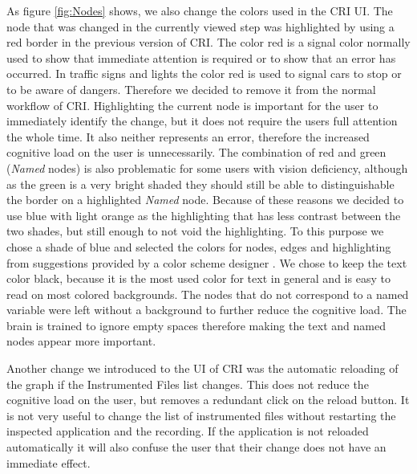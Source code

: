 As figure \ref{fig:Nodes} shows, we also change the colors used in the CRI UI. The node that was changed in the currently viewed step was highlighted by using a red border in the previous version of CRI. The color red is a signal color normally used to show that immediate attention is required or to show that an error has occurred. In traffic signs and lights the color red is used to signal cars to stop or to be aware of dangers. Therefore we decided to remove it from the normal workflow of CRI. Highlighting the current node is important for the user to immediately identify the change, but it does not require the users full attention the whole time. It also neither represents an error, therefore the increased cognitive load on the user is unnecessarily. The combination of red and green (\emph{Named} nodes) is also problematic for some users with vision deficiency, although as the green is a very bright shaded they should still be able to distinguishable the border on a highlighted \emph{Named} node. Because of these reasons we decided to use blue with light orange as the highlighting that has less contrast between the two shades, but still enough to not void the highlighting. To this purpose we chose a shade of blue and selected the colors for nodes, edges and highlighting from suggestions provided by a color scheme designer \cite{Paletton}. We chose to keep the text color black, because it is the most used color for text in general and is easy to read on most colored backgrounds. The nodes that do not correspond to a named variable were left without a background to further reduce the cognitive load. The brain is trained to ignore empty spaces therefore making the text and named nodes appear more important.

Another change we introduced to the UI of CRI was the automatic reloading of the graph if the Instrumented Files list changes. This does not reduce the cognitive load on the user, but removes a redundant click on the reload button. It is not very useful to change the list of instrumented files without restarting the inspected application and the recording. If the application is not reloaded automatically it will also confuse the user that their change does not have an immediate effect. %
	
